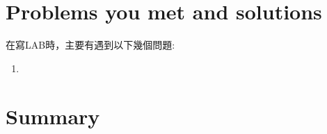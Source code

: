 \documentclass[12pt,a4paper]{article}
\theoremstyle{definition}
\begin{document}
\section{Problems you met and solutions}

在寫LAB時，主要有遇到以下幾個問題:
\begin{enumerate}
\item
\end{enumerate}

\section{Summary}



\end{document}
